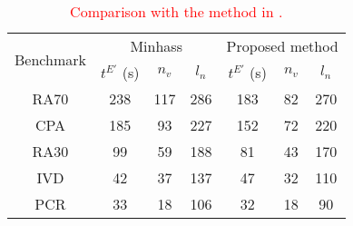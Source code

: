 \begin{table}[t]\small
    \centering
    \caption{\textcolor{red}{Comparison with the method in \cite{minhass2012architectural}.}}
      \begin{tabular}{|c||c|c|c|c|c|c|}\hline
        \multirow{2}[0]{*}{Benchmark} &  \multicolumn{3}{c|}{Minhass \cite{minhass2012architectural}} & \multicolumn{3}{c|}{Proposed method}   \\\cline{2-7}
           & $t^{E'}$ (s) & $n_v$    & $l_n$   & $t^{E'}$ (s) & $n_v$    & $l_n$  \\\hline\hline
      RA70         &238	&117	&286 &183	&82	&270      \\\hline
      CPA         &185	&93	&227	&152	&72	&220      \\\hline
      RA30         &99	&59	&188	&81	&43	&170      \\\hline
      IVD         &42	&37	&137	&47	&32	&110      \\\hline
      PCR         &33	&18	&106	&32	&18	&90      \\\hline
      \end{tabular}%
    \label{tb_Minhass_compare}%
  \end{table}%
